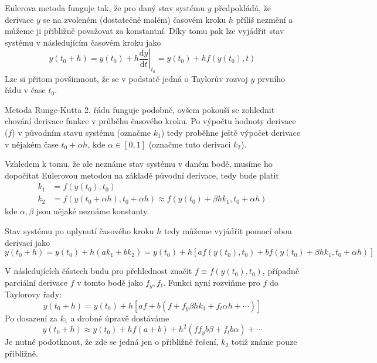 \documentclass[a4paper,11pt]{article}
\begin{document}
Eulerova metoda funguje tak, že pro daný stav systému $y$ předpokládá, že derivace $y$ se na zvoleném (dostatečně malém)
časovém kroku $h$ příliš nezmění a můžeme ji přibližně považovat za konstantní. Díky tomu
pak lze vyjádřit stav systému v následujícím časovém kroku jako
\begin{equation*}
    y(t_0 + h) = y(t_0) + h \left. \frac{\mathrm{d} y}{\mathrm{d} t} \right\rvert_{t_0} = y(t_0) + h f(y(t_0), t)
\end{equation*}
Lze si přitom povšimnout, že se v podstatě jedná o Taylorův rozvoj $y$ prvního řádu v čase $t_0$.

Metoda Runge-Kutta 2. řádu funguje podobně, ovšem pokouší se zohlednit chování derivace funkce 
v průběhu časového kroku. Po výpočtu hodnoty derivace ($f$) v původním stavu systému (označme $k_1$)
tedy proběhne ještě výpočet derivace v nějakém čase $t_0 + \alpha h$, kde $\alpha \in [0, 1]$ (označme 
tuto derivaci $k_2$).

Vzhledem k tomu, že ale neznáme stav systému v daném bodě, musíme ho dopočítat Eulerovou metodou na základě původní derivace, tedy
bude platit
\begin{align*}
    k_1 &= f(y(t_0), t_0) \\
    k_2 &= f(y(t_0 + \alpha h), t_0 + \alpha h) \approx f(y(t_0) + \beta h k_1, t_0 + \alpha h)
\end{align*}
kde $\alpha, \beta$ jsou nějaké neznáme konstanty.

Stav systému po uplynutí časového kroku $h$ tedy můžeme vyjádřit pomocí obou derivací jako
\begin{equation*}
    y(t_0 + h) = y(t_0) + h (a k_1 + b k_2) = y(t_0) + h [a f(y(t_0), t_0) + b f(y(t_0) + \beta h k_1, t_0 + \alpha h)]
\end{equation*}

V následujících částech budu pro přehlednost značit $f \equiv f(y(t_0), t_0)$, 
případně parciální derivace $f$ v tomto bodě jako $f_y, f_t$.
Funkci nyní rozviňme pro $f$ do Taylorovy řady:
\begin{equation*}
    y(t_0 + h) = y(t_0) + h[a f + b (f + f_y \beta h k_1 + f_t \alpha h + \cdots)]
\end{equation*}
Po dosazení za $k_1$ a drobné úpravě dostáváme
\begin{equation*}
    y(t_0 + h) \approx y(t_0) + hf(a + b) + h^2 (f f_y b \beta + f_t b \alpha) + \cdots
\end{equation*}
Je nutné podotknout, že zde se jedná jen o přibližně řešení, $k_2$ totiž známe pouze přibližně.
\end{document}
